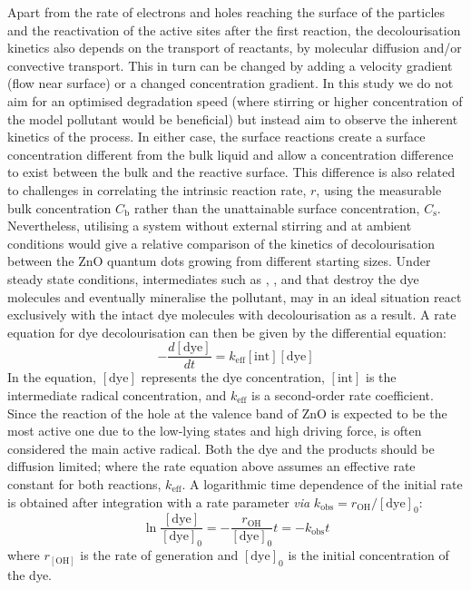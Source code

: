 \documentclass[9pt,twoside,twocolumn]{article}\usepackage{knitr}
\begin{document}
\begin{refsection}
\begin{table}[tbp]
\begin{small}
\end{small}
\end{table}



Apart from the rate of electrons and holes reaching the surface of the  particles and the reactivation of the active sites after the first reaction, the decolourisation kinetics also depends on the transport of reactants, by molecular diffusion and/or convective transport. This in turn can be changed by adding a velocity gradient (flow near surface) or a changed concentration gradient. In this study we do not aim for an optimised degradation speed (where stirring or higher concentration of the model pollutant would be beneficial) but instead aim to observe the inherent kinetics of the process. In either case, the surface reactions create a surface concentration different from the bulk liquid and allow a concentration difference to exist between the bulk and the reactive surface. This difference is also related to challenges in correlating the intrinsic reaction rate, $r$, using the measurable bulk concentration $C_\text{b}$ rather than the unattainable surface concentration, $C_\text{s}$.  Nevertheless, utilising a system without external stirring and at ambient conditions would give a relative comparison of the kinetics of decolourisation between the ZnO quantum dots growing from different starting sizes.
Under steady state conditions, intermediates such as , , and  that destroy the dye molecules and eventually mineralise the pollutant, may in an ideal situation react exclusively with the intact dye molecules with decolourisation as a result. A rate equation for dye decolourisation can then be given by the differential equation:
\begin{equation}
-\frac{d[\text{dye}]}{dt} = k_\text{eff} [\text{int}] [\text{dye}]
\end{equation}%
In the equation, $[\text{dye}]$ represents the dye concentration, $[\text{int}]$ is the intermediate radical concentration, and $k_\text{eff}$ is a second-order rate coefficient. Since the reaction of the hole at the valence band of ZnO is expected to be the most active one due to the low-lying states and high driving force,  is often considered the main active radical. Both the dye and the products should be diffusion limited; where the rate equation above assumes an effective rate constant for both reactions, $k_\text{eff}$. 
A logarithmic time dependence of the initial rate is obtained after integration with a rate parameter \emph{via} $k_\text{obs} = r_\text{OH}/[\text{dye}]_0$:
\begin{equation}\label{eq:logconc-kobs}
\ln\frac{[\text{dye}]}{[\text{dye}]_0} = -\frac{r_\text{OH}}{[\text{dye}]_0}t = -k_\text{obs}t
\end{equation}%
 where $r_{[\text{OH}]}$ is the rate of  generation and $[\text{dye}]_{0}$ is the initial concentration of the dye.
 

\end{refsection}
\end{document}
